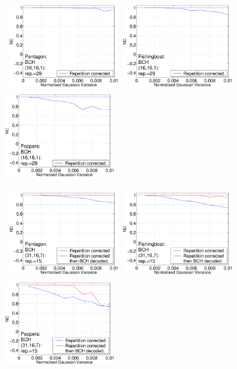 \documentclass[12pt]{report}
\begin{document}
\begin{figure}[p]
\setlength{\abovecaptionskip}{-0.25cm}
\centerline{ \hbox{
\includegraphics[height=3.81cm,width=4.8cm]{EPS_BK_formattedBetter/WGpent16.eps}
\includegraphics[height=3.81cm,width=4.8cm]{EPS_BK_formattedBetter/WGfish16.eps}
\includegraphics[height=3.81cm,width=4.8cm]{EPS_BK_formattedBetter/WGpep16.eps}
}}
 
\centerline{ \hbox{
\includegraphics[height=3.81cm,width=4.8cm]{EPS_BK_formattedBetter/WGpent31.eps}
\includegraphics[height=3.81cm,width=4.8cm]{EPS_BK_formattedBetter/WGfish31.eps}
\includegraphics[height=3.81cm,width=4.8cm]{EPS_BK_formattedBetter/WGpep31.eps}
}}
 

\end{figure}
\end{document}
